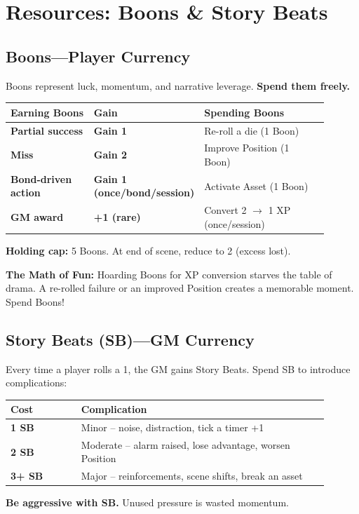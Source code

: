 \documentclass[10pt,twocolumn]{article} %
\begin{document}
\section{Resources: Boons \& Story Beats}

\subsection{Boons—Player Currency}
Boons represent luck, momentum, and narrative leverage. \textbf{Spend them freely.}
\begin{coretable}
\begin{tabular}{>{\bfseries}p{0.3\linewidth} >{\bfseries}p{0.15\linewidth} p{0.45\linewidth}}
\toprule
\textbf{Earning Boons} & \textbf{Gain} & \textbf{Spending Boons} \\
\midrule
Partial success & Gain 1 & Re-roll a die (1 Boon) \\
Miss & Gain 2 & Improve Position (1 Boon) \\
Bond-driven action & Gain 1 (once/bond/session) & Activate Asset (1 Boon) \\
GM award & +1 (rare) & Convert 2 $\to$ 1 XP (once/session) \\
\bottomrule
\end{tabular}
\end{coretable}
\textbf{Holding cap:} 5 Boons. At end of scene, reduce to 2 (excess lost).

\begin{sidebar}
    \textbf{The Math of Fun:} Hoarding Boons for XP conversion starves the table of drama. A re-rolled failure or an improved Position creates a memorable moment. Spend Boons!
\end{sidebar}

\subsection{Story Beats (SB)—GM Currency}
Every time a player rolls a 1, the GM gains Story Beats. Spend SB to introduce complications:
\begin{coretable}
\begin{tabular}{>{\bfseries}p{0.2\linewidth} p{0.7\linewidth}}
\toprule
\textbf{Cost} & \textbf{Complication} \\
\midrule
1 SB & Minor – noise, distraction, tick a timer +1 \\
2 SB & Moderate – alarm raised, lose advantage, worsen Position \\
3+ SB & Major – reinforcements, scene shifts, break an asset \\
\bottomrule
\end{tabular}
\end{coretable}
\textbf{Be aggressive with SB.} Unused pressure is wasted momentum.
\end{document}
